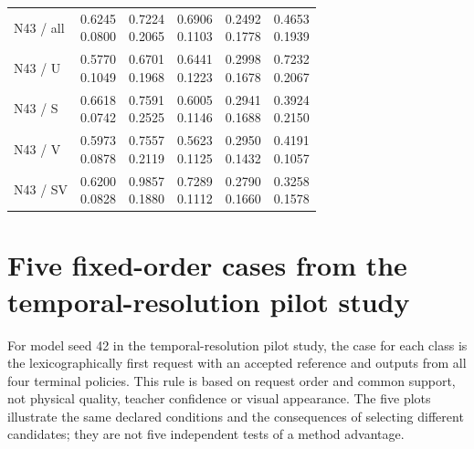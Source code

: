 \begin{table}[htbp]
\begin{tabularx}{\linewidth}{@{}l*{5}{>{\centering\arraybackslash}X}@{}}
\midrule
N43 / all & \shortstack{0.6245\\0.0800} & \shortstack{0.7224\\0.2065} & \shortstack{0.6906\\0.1103} & \shortstack{0.2492\\0.1778} & \shortstack{0.4653\\0.1939}\\
N43 / U & \shortstack{0.5770\\0.1049} & \shortstack{0.6701\\0.1968} & \shortstack{0.6441\\0.1223} & \shortstack{0.2998\\0.1678} & \shortstack{0.7232\\0.2067}\\
N43 / S & \shortstack{0.6618\\0.0742} & \shortstack{0.7591\\0.2525} & \shortstack{0.6005\\0.1146} & \shortstack{0.2941\\0.1688} & \shortstack{0.3924\\0.2150}\\
N43 / V & \shortstack{0.5973\\0.0878} & \shortstack{0.7557\\0.2119} & \shortstack{0.5623\\0.1125} & \shortstack{0.2950\\0.1432} & \shortstack{0.4191\\0.1057}\\
N43 / SV & \shortstack{0.6200\\0.0828} & \shortstack{0.9857\\0.1880} & \shortstack{0.7289\\0.1112} & \shortstack{0.2790\\0.1660} & \shortstack{0.3258\\0.1578}\\
\bottomrule
\end{tabularx}
\end{table}
\FloatBarrier

\section{Five fixed-order cases from the temporal-resolution pilot study}
For model seed 42 in the temporal-resolution pilot study, the case for each class is the lexicographically first request with an accepted reference and outputs from all four terminal policies. This rule is based on request order and common support, not physical quality, teacher confidence or visual appearance. The five plots illustrate the same declared conditions and the consequences of selecting different candidates; they are not five independent tests of a method advantage.

